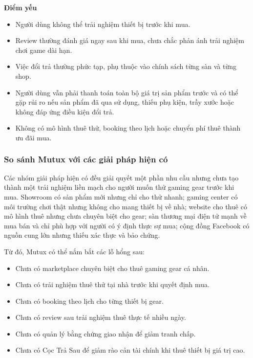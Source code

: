 \textbf{Điểm yếu}
\begin{itemize}
    \item Người dùng không thể trải nghiệm thiết bị trước khi mua.
    \item Review thường đánh giá ngay sau khi mua, chưa chắc phản ánh trải nghiệm chơi game dài hạn.
    \item Việc đổi trả thường phức tạp, phụ thuộc vào chính sách từng sàn và từng shop.
    \item Người dùng vẫn phải thanh toán toàn bộ giá trị sản phẩm trước và có thể gặp rủi ro nếu sản phẩm đã qua sử dụng, thiếu phụ kiện, trầy xước hoặc không đáp ứng điều kiện đổi trả.
    \item Không có mô hình thuê thử, booking theo lịch hoặc chuyển phí thuê thành ưu đãi mua.
\end{itemize}




\subsubsection{So sánh Mutux với các giải pháp hiện có}
Các nhóm giải pháp hiện có đều giải quyết một phần nhu cầu nhưng chưa tạo thành một trải nghiệm liền mạch cho người muốn thử gaming gear trước khi mua. Showroom có sản phẩm mới nhưng chỉ cho thử nhanh; gaming center có môi trường chơi thật nhưng không cho mang thiết bị về nhà; website cho thuê có mô hình thuê nhưng chưa chuyên biệt cho gear; sàn thương mại điện tử mạnh về mua bán và chỉ phù hợp với người có ý định thực sự mua; cộng đồng Facebook có nguồn cung lớn nhưng thiếu xác thực và bảo chứng.

Từ đó, Mutux có thể nắm bắt các lỗ hổng sau:

\begin{itemize}
    \item Chưa có marketplace chuyên biệt cho thuê gaming gear cá nhân.
    \item Chưa có trải nghiệm thuê thử tại nhà trước khi quyết định mua.
    \item Chưa có booking theo lịch cho từng thiết bị gear.
    \item Chưa có review sau trải nghiệm thuê thực tế nhiều ngày.
    \item Chưa có quản lý bằng chứng giao nhận để giảm tranh chấp.
    \item Chưa có Cọc Trả Sau để giảm rào cản tài chính khi thuê thiết bị giá trị cao.
\end{itemize}

